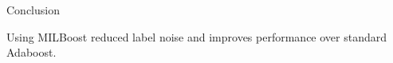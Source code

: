 \documentclass{beamer}
\begin{document}
	\begin{frame}{Conclusion}
		\begin{center}
			Using MILBoost reduced label noise and improves performance over standard Adaboost.
		\end{center}
	\end{frame}

	
		
		
	

\end{document}
